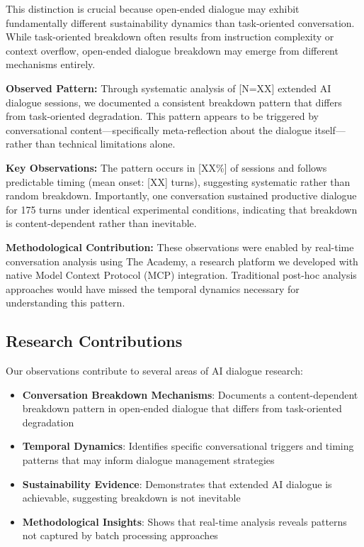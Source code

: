 \documentclass[11pt,letterpaper]{article}
\newcommand{\theacademy}{The Academy}
\newcommand{\totalSessions}{[N=XX]} %
\newcommand{\breakdownPercentage}{[XX\%]} %
\newcommand{\meanBreakdownTurn}{[XX]} %
\newcommand{\negativeCase}{175} %
\begin{document}
This distinction is crucial because open-ended dialogue may exhibit fundamentally different sustainability dynamics than task-oriented conversation. While task-oriented breakdown often results from instruction complexity or context overflow, open-ended dialogue breakdown may emerge from different mechanisms entirely.

\textbf{Observed Pattern:} Through systematic analysis of \totalSessions{} extended AI dialogue sessions, we documented a consistent breakdown pattern that differs from task-oriented degradation. This pattern appears to be triggered by conversational content—specifically meta-reflection about the dialogue itself—rather than technical limitations alone.

\textbf{Key Observations:} The pattern occurs in \breakdownPercentage{} of sessions and follows predictable timing (mean onset: \meanBreakdownTurn{} turns), suggesting systematic rather than random breakdown. Importantly, one conversation sustained productive dialogue for \negativeCase{} turns under identical experimental conditions, indicating that breakdown is content-dependent rather than inevitable.

\textbf{Methodological Contribution:} These observations were enabled by real-time conversation analysis using \theacademy{}, a research platform we developed with native Model Context Protocol (MCP) integration. Traditional post-hoc analysis approaches would have missed the temporal dynamics necessary for understanding this pattern.

\subsection{Research Contributions}

Our observations contribute to several areas of AI dialogue research:

\begin{itemize}
    \item \textbf{Conversation Breakdown Mechanisms}: Documents a content-dependent breakdown pattern in open-ended dialogue that differs from task-oriented degradation
    \item \textbf{Temporal Dynamics}: Identifies specific conversational triggers and timing patterns that may inform dialogue management strategies
    \item \textbf{Sustainability Evidence}: Demonstrates that extended AI dialogue is achievable, suggesting breakdown is not inevitable
    \item \textbf{Methodological Insights}: Shows that real-time analysis reveals patterns not captured by batch processing approaches
\end{itemize}
\end{document}
